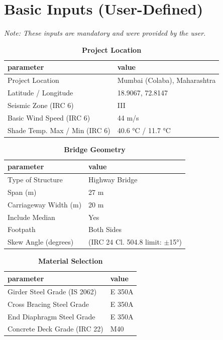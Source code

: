 \documentclass[12pt,a4paper]{report}
\numberwithin{table}{chapter}
\numberwithin{figure}{chapter}
\begin{document}
\section{Basic Inputs (User-Defined)}
\label{sec:basic-inputs}

\noindent\textit{Note: These inputs are mandatory and were provided by the user.}

\begin{table}[H]
\caption{\textbf{Project Location}}
\label{subsec:project-location}
\begin{tabular}{|L{5.5cm}|L{8.5cm}|}
\hline
\textbf{parameter} & \textbf{value} \\
\hline
\textnormal{Project Location} & Mumbai (Colaba), Maharashtra \\
\hline
\textnormal{Latitude / Longitude} & 18.9067, 72.8147 \\
\hline
\textnormal{Seismic Zone (IRC 6)} & III \\
\hline
\textnormal{Basic Wind Speed (IRC 6)} & 44 m/s \\
\hline
\textnormal{Shade Temp. Max / Min (IRC 6)} & 40.6 °C / 11.7 °C \\
\hline
\end{tabular}
\vspace{0.4cm}
\end{table}

\begin{table}[H]
\caption{\textbf{Bridge Geometry}}
\label{subsec:bridge-geometry}
\begin{tabular}{|L{5.5cm}|L{8.5cm}|}
\hline
\textbf{parameter} & \textbf{value} \\
\hline
\textnormal{Type of Structure} & Highway Bridge \\
\hline
\textnormal{Span (m)} & 27 m \\
\hline
\textnormal{Carriageway Width (m)} & 20 m \\
\hline
\textnormal{Include Median} & Yes \\
\hline
\textnormal{Footpath} & Both Sides \\
\hline
\textnormal{Skew Angle (degrees)} &  (IRC 24 Cl. 504.8 limit: $\pm$15°) \\
\hline
\end{tabular}
\end{table}
\vspace{0.4cm}

\begin{table}[H]
\caption{\textbf{Material Selection}}
\label{subsec:material}
\begin{tabular}{|L{5.5cm}|L{8.5cm}|}
\hline
\textbf{parameter} & \textbf{value} \\
\hline
\textnormal{Girder Steel Grade (IS 2062)} & E 350A \\
\hline
\textnormal{Cross Bracing Steel Grade} & E 350A \\
\hline
\textnormal{End Diaphragm Steel Grade} & E 350A \\
\hline
\textnormal{Concrete Deck Grade (IRC 22)} & M40 \\
\hline
\end{tabular}
\end{table}
\vspace{0.4cm}
\end{document}

